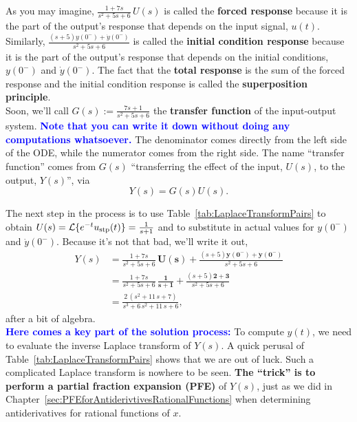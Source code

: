 As you may imagine, $\frac{1 + 7 s}{s^2 + 5 s + 6 } \, U(s)$ is called the \textbf{forced response} because it is the part of the output's response that depends on the input signal, $u(t)$. Similarly, $\frac{ \left( s+5 \right) y(0^-) +  \dot{y}(0^-) }{s^2 + 5 s + 6}$ is called the \textbf{initial condition response} because it is the part of the output's response that depends on the initial conditions, $y(0^-)$ and $\dot{y}(0^-)$. The fact that the \textbf{total response} is the sum of the forced response and the initial condition response is called the \textbf{superposition principle}.\\

Soon, we'll call $G(s):= \frac{7 s + 1}{s^2 + 5 s + 6 }$ the \textbf{transfer function} of the input-output system. \textcolor{blue}{\bf Note that you can write it down without doing any computations whatsoever.} The denominator comes directly from the left side of the ODE, while the numerator comes from the right side. The name ``transfer function'' comes from $G(s)$ ``transferring the effect of the input, $U(s)$, to the output, $Y(s)$'', via
$$ Y(s) = G(s) U(s).$$

The next step in the process is to use Table~\ref{tab:LaplaceTransformPairs} to obtain $U(s) = {\cal L}\{  e^{-t} u_{\rm stp}(t)\} = \frac{1}{s+1}$ and to substitute in actual values for $y(0^-)$ and $\dot{y}(0^-)$. Because it's not that bad, we'll write it out,
\begin{align*}
     Y(s) &= \frac{1 + 7 s}{s^2 + 5 s + 6 } \, \bm{U(s)} +  \frac{ \left( s+5 \right) \bm{ y(0^{-}) } +  \bm{\dot{y}(0^{-})} }{s^2 + 5 s + 6} \\[1em]
     & =  \frac{1 + 7 s}{s^2 + 5 s + 6 } \, \bm{\frac{1}{s+1}} +  \frac{ \left( s+5 \right) \bm{2} +  \bm{3} }{s^2 + 5 s + 6}  \\[1em]
     &=\frac{2  \, \left( s^{2} + 11  \, s + 7 \right)}{s^{3} + 6  \, s^{2} + 11  \, s + 6},
\end{align*}
after a bit of algebra. \\

\textcolor{blue}{\bf Here comes a key part of the solution process:} To compute $y(t)$, we need to evaluate the inverse Laplace transform of $Y(s)$. A quick perusal of Table~\ref{tab:LaplaceTransformPairs} shows that we are out of luck. Such a complicated Laplace transform is nowhere to be seen. \textbf{The ``trick'' is to perform a partial fraction expansion (PFE)} of $Y(s)$, just as we did in Chapter~\ref{sec:PFEforAntiderivtivesRationalFunctions} when determining antiderivatives for rational functions of $x$. 

